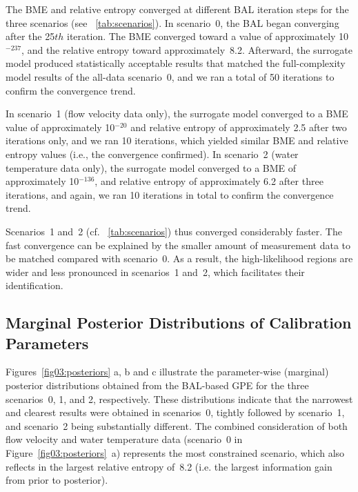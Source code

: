 \documentclass[draft,linenumbers,onecolumn]{agujournal2019} %
\begin{document}
The BME and relative entropy converged at different BAL iteration steps for the three scenarios (see \tablename{~\ref{tab:scenarios}}). In scenario~0, the BAL began converging after the 25${th}$ iteration. The BME converged toward a value of approximately 10$^{-237}$, and the relative entropy toward approximately~8.2. Afterward, the surrogate model produced statistically acceptable results that matched the full-complexity model results of the all-data scenario~0, and we ran a total of 50 iterations to confirm the convergence trend.

In scenario~1 (flow velocity data only), the surrogate model converged to a BME value of approximately 10$^{-20}$ and relative entropy of approximately 2.5 after two iterations only, and we ran 10 iterations, which yielded similar BME and relative entropy values (i.e., the convergence confirmed). In scenario~2 (water temperature data only), the surrogate model converged to a BME of approximately 10$^{-136}$, and relative entropy of approximately 6.2 after three iterations, and again, we ran 10 iterations in total to confirm the convergence trend.

Scenarios~1 and~2 (cf. \tablename{~\ref{tab:scenarios}}) thus converged considerably faster. The fast convergence can be explained by the smaller amount of measurement data to be matched compared with scenario~0. As a result, the high-likelihood regions are wider and less pronounced in scenarios~1 and~2, which facilitates their identification.

\subsection{Marginal Posterior Distributions of Calibration Parameters}

Figures~\ref{fig03:posteriors} a, b and c illustrate the parameter-wise (marginal) posterior distributions obtained from the BAL-based GPE for the three scenarios~0, 1, and 2, respectively. These distributions indicate that the narrowest and clearest results were obtained in scenarios~0, tightly followed by scenario~1, and scenario~2 being substantially different. The combined consideration of both flow velocity and water temperature data (scenario~0 in Figure~\ref{fig03:posteriors}~a) represents the most constrained scenario, which also reflects in the largest relative entropy of~8.2 (i.e. the largest information gain from prior to posterior).
\end{document}
